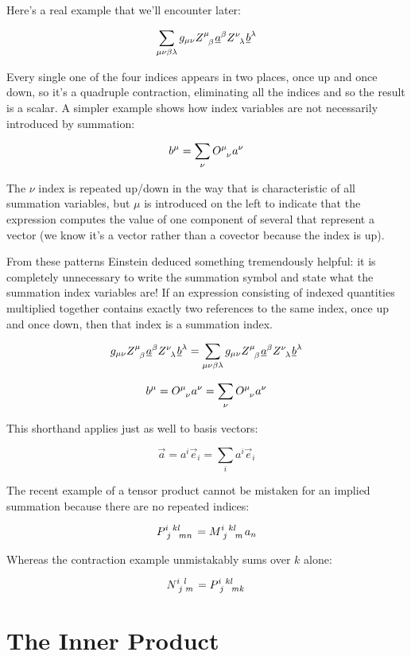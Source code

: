 Here's a real example that we'll encounter later:

$$
\sum_{\mu\nu\beta\lambda} g_{\mu\nu} Z\indices{^\mu_\beta} \underline{a}^{\beta} Z\indices{^\nu_\lambda} \underline{b}^{\lambda}
$$

Every single one of the four indices appears in two places, once up and once down, so it's a quadruple contraction, eliminating all the indices and so the result is a scalar. A simpler example shows how index variables are not necessarily introduced by summation:

$$
b^\mu = \sum_{\nu} O\indices{^\mu_\nu} a^\nu
$$

The $\nu$ index is repeated up/down in the way that is characteristic of all summation variables, but $\mu$ is introduced on the left to indicate that the expression computes the value of one component of several that represent a vector (we know it's a vector rather than a covector because the index is up).

From these patterns Einstein deduced something tremendously helpful: it is completely unnecessary to write the summation symbol and state what the summation index variables are! If an expression consisting of indexed quantities multiplied together contains exactly two references to the same index, once up and once down, then that index is a summation index.

$$
g_{\mu\nu} Z\indices{^\mu_\beta} \underline{a}^{\beta} Z\indices{^\nu_\lambda} \underline{b}^{\lambda}
=
\sum_{\mu\nu\beta\lambda} g_{\mu\nu} Z\indices{^\mu_\beta} \underline{a}^{\beta} Z\indices{^\nu_\lambda} \underline{b}^{\lambda}
$$

$$
b^\mu = O\indices{^\mu_\nu} a^\nu = \sum_{\nu} O\indices{^\mu_\nu} a^\nu
$$

This shorthand applies just as well to basis vectors:

$$
\vec{a} = a^i \vec{e}_i = \sum_{i} a^i \vec{e}_i
$$

The recent example of a tensor product cannot be mistaken for an implied summation because there are no repeated indices:

$$
P\indices{^i_j^k^l_m_n} = M\indices{^i_j^k^l_m} a_n
$$
 
Whereas the contraction example unmistakably sums over $k$ alone:

$$
N\indices{^i_j^l_m} = P\indices{^i_j^k^l_m_k}
$$

\section{The Inner Product} \label{inner-product}


